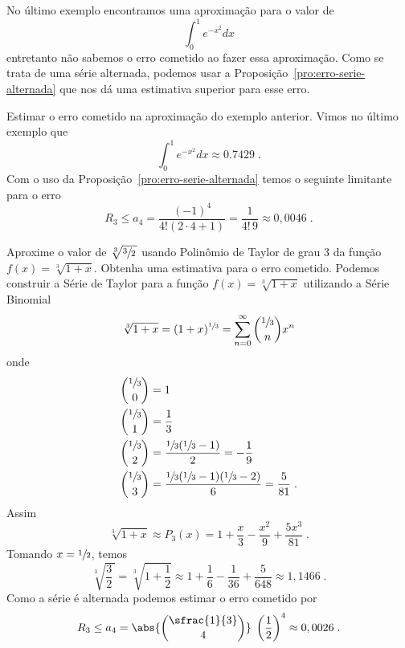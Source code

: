 No último exemplo encontramos uma aproximação para o valor de
\[
  \int_0^1e^{-x^2}dx
\]
entretanto não sabemos o erro cometido ao fazer essa aproximação.
Como se trata de uma série alternada, podemos usar a
Proposição~\ref{pro:erro-serie-alternada}
que nos dá uma estimativa superior para esse erro.

\begin{example}
  Estimar o erro cometido na aproximação do exemplo anterior.
  \solution
	Vimos no último exemplo que
	\[
  	\int_0^1e^{-x^2}dx \approx 0.7429   \;.
	\]
	Com o uso da Proposição~\ref{pro:erro-serie-alternada}
  temos o seguinte limitante para o erro
	\[
  	R_3 \leq a_4
    = \frac{(-1)^4}{4!(2\cdot 4+1)}
    = \frac{1}{4!\,9}
    \approx 0,0046   \;.
	\]
\end{example}

\begin{example}
  Aproxime o valor de
  \(
    \sqrt[3]{\sfrac{3}{2}\,}
  \)
  usando Polinômio de Taylor de grau 3 da função
  \(
    f(x)=\sqrt[3]{1+x}
  \).
  Obtenha uma estimativa para o erro cometido.
  \solution
  Podemos construir a Série de Taylor para a função \(f(x)=\sqrt[3]{1+x}\)
  utilizando a Série Binomial
	\[
    \sqrt[3]{1+x} = (1+x)^{\sfrac{1}{3}}
                  = \sum_{n=0}^\infty \binom{\sfrac{1}{3}}{n} x^n
  \]
	onde
  \begin{align*}
    \binom{\sfrac{1}{3}}{0} & = 1                                                                     \\
    \binom{\sfrac{1}{3}}{1} & = \frac{1}{3}                                                           \\
    \binom{\sfrac{1}{3}}{2} & = \frac{\sfrac{1}{3}(\sfrac{1}{3}-1)}{2} = -\frac{1}{9}                 \\
    \binom{\sfrac{1}{3}}{3} & = \frac{\sfrac{1}{3}(\sfrac{1}{3}-1)(\sfrac{1}{3}-2)}{6} = \frac{5}{81} \;.
  \end{align*}
	Assim
	\[
  	\sqrt[3]{1+x} \approx P_3(x) = 1 + \frac{x}{3} - \frac{x^2}{9} + \frac{5x^3}{81} \;.
	\]
	Tomando $x=\sfrac{1}{2}$, temos
	\[
  	\sqrt[3]{\frac{3}{2}\,} = \sqrt[3]{1+\frac{1}{2}}
                           	\approx 1 + \frac{1}{6} - \frac{1}{36} + \frac{5}{648}
                          	\approx 1,1466 \;.
	\]
  Como a série é alternada podemos estimar o erro cometido por
	\[
  	R_3 \leq a_4
      = \abs{\binom{\sfrac{1}{3}}{4}} \; \left(\frac{1}{2}\right)^4
        \approx 0,0026 \;.
	\]
\end{example}

